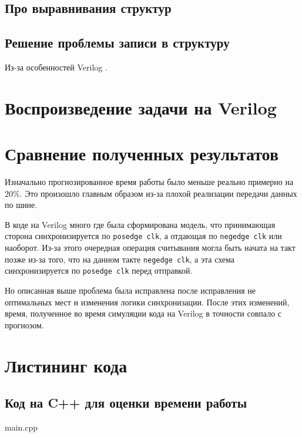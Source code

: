\documentclass[14pt, russian, onesize]{extreport}
\newenvironment{code}{\captionsetup{type=listing}}{}
\begin{document}
\subsection*{ Про выравнивания структур }

\subsection*{ Решение проблемы записи в структуру }
Из-за особенностей Verilog .

\section*{ Воспроизведение задачи на Verilog }

\section*{ Сравнение полученных результатов }
Изначально прогнозированное время работы было меньше реально примерно на 20\%.
Это произошло главным образом из-за плохой реализации передачи данных по шине. 

В коде на Verilog много где была сформирована модель, что
принимающая сторона синхронизируется по \texttt{posedge clk},
а отдающая по \texttt{negedge clk} или наоборот.
Из-за этого очередная операция считывания могла быть начата
на такт позже из-за того, что на данном такте \texttt{negedge clk},
а эта схема синхронизируется по \texttt{posedge clk} перед отправкой.

Но описанная выше проблема была исправлена после исправления не оптимальных мест
и изменения логики синхронизации. После этих изменений, время, полученное во время
симуляции кода на Verilog в точности совпало с прогнозом.

\section*{ Листининг кода }
\subsection*{ Код на C++ для оценки времени работы }
\begin{code}
    \caption{main.cpp}
\end{code}
\end{document}
